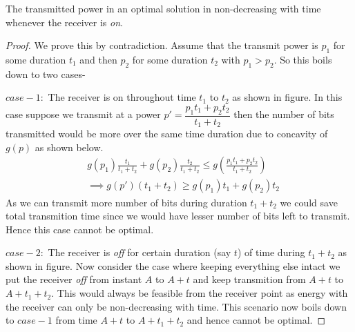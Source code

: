 \begin{lemma}
The transmitted power in an optimal solution in non-decreasing with time whenever the receiver is \textit{on}.
\label{increasing_power}
\end{lemma}
\begin{proof}
We prove this by contradiction. Assume that the transmit power is $p_1$ for some duration $t_1$ and then $p_2$ for some duration $t_2$ with $p_1>p_2$. So this boils down to two cases-

$case-1:$ The receiver is on throughout time $t_1$ to $t_2$ as shown in figure. In this case suppose we transmit at a power $p'=\dfrac{p_1t_1+p_2t_2}{t_1+t_2}$ then the number of bits transmitted would be more over the same time duration due to concavity of $g(p)$ as shown below.
\begin{align}
&g(p_1)\frac{t_1}{t_1+t_2}+g(p_2)\frac{t_2}{t_1+t_2} \le g(\frac{p_1t_1+p_2t_2}{t_1+t_2})
\\
&\implies g(p')(t_1+t_2)\ge g(p_1)t_1+g(p_2)t_2  
\end{align}
As we can transmit more number of bits during duration $t_1+t_2$ we could save total transmition time since we would have lesser number of bits left to transmit. Hence this case cannot be optimal.

$case-2:$ The receiver is \textit{off} for certain duration (say $t$) of time during $t_1+t_2$ as shown in figure. Now consider the case where keeping everything else intact we put the receiver \textit{off} from instant $A$ to $A+t$ and keep transmition from $A+t$ to $A+t_1+t_2$. This would always be feasible from the receiver point as energy with the receiver can only be non-decreasing with time. This scenario now boils down to $case-1$ from time $A+t$ to $A+t_1+t_2$ and hence cannot be optimal.
\end{proof}

